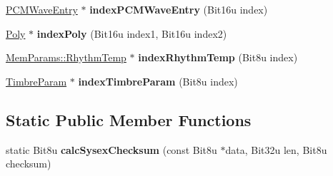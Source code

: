 \begin{DoxyCompactItemize}
\item 
\hypertarget{classMT32Emu_1_1Synth_a278ab6810627a2aad099fa1fc81a7f8b}{\hyperlink{structMT32Emu_1_1PCMWaveEntry}{P\-C\-M\-Wave\-Entry} $\ast$ {\bfseries index\-P\-C\-M\-Wave\-Entry} (Bit16u index)}\label{classMT32Emu_1_1Synth_a278ab6810627a2aad099fa1fc81a7f8b}

\item 
\hypertarget{classMT32Emu_1_1Synth_a047139a7f562cc78738aff3db7f43811}{\hyperlink{classMT32Emu_1_1Poly}{Poly} $\ast$ {\bfseries index\-Poly} (Bit16u index1, Bit16u index2)}\label{classMT32Emu_1_1Synth_a047139a7f562cc78738aff3db7f43811}

\item 
\hypertarget{classMT32Emu_1_1Synth_a5a7be8835453bbfe9f3f0cf1516b5dca}{\hyperlink{structMT32Emu_1_1MemParams_1_1RhythmTemp}{Mem\-Params\-::\-Rhythm\-Temp} $\ast$ {\bfseries index\-Rhythm\-Temp} (Bit8u index)}\label{classMT32Emu_1_1Synth_a5a7be8835453bbfe9f3f0cf1516b5dca}

\item 
\hypertarget{classMT32Emu_1_1Synth_a5d243a1c40e32c4d742676780027b625}{\hyperlink{structMT32Emu_1_1TimbreParam}{Timbre\-Param} $\ast$ {\bfseries index\-Timbre\-Param} (Bit8u index)}\label{classMT32Emu_1_1Synth_a5d243a1c40e32c4d742676780027b625}

\end{DoxyCompactItemize}
\subsection*{Static Public Member Functions}
\begin{DoxyCompactItemize}
\item 
\hypertarget{classMT32Emu_1_1Synth_ade0bb87fe277dcb6a5faba8c731c8573}{static Bit8u {\bfseries calc\-Sysex\-Checksum} (const Bit8u $\ast$data, Bit32u len, Bit8u checksum)}\label{classMT32Emu_1_1Synth_ade0bb87fe277dcb6a5faba8c731c8573}

\end{DoxyCompactItemize}
